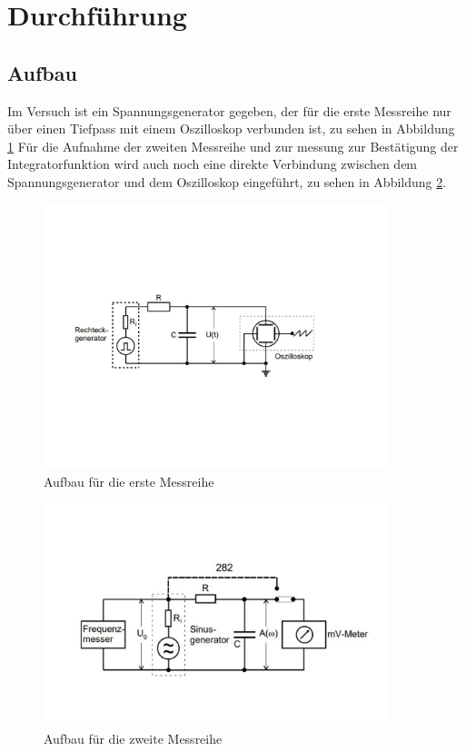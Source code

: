 \section{Durchführung}
\label{sec:Durchführung}
\subsection{Aufbau}
Im Versuch ist ein Spannungsgenerator gegeben, der für die erste Messreihe nur über einen Tiefpass mit einem Oszilloskop verbunden ist, zu sehen in Abbildung \ref{foto1} 
Für die Aufnahme der zweiten Messreihe und zur messung zur Bestätigung der Integratorfunktion wird auch noch eine direkte Verbindung zwischen dem Spannungsgenerator und dem Oszilloskop eingeführt, zu sehen in Abbildung \ref{foto2}.
\begin{figure}
\centering
\includegraphics[width = 10cm]{V353foto4.pdf}
\caption{Aufbau für die erste Messreihe \cite{V353}}
\label{foto1}
\end{figure}

\begin{figure}
    \centering
    \includegraphics[width = 10cm]{V353foto5.pdf}
    \caption{Aufbau für die zweite Messreihe \cite{V353}}
    \label{foto2}
    \end{figure}

